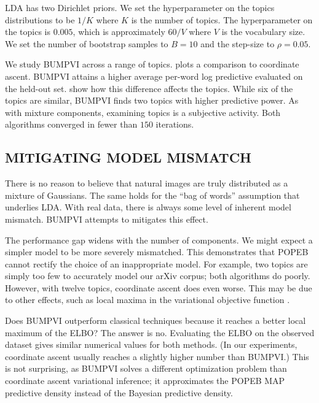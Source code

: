 \gls{LDA} has two Dirichlet priors. We set the hyperparameter on the topics
distributions to be $1/K$ where $K$ is the number of topics. The hyperparameter
on the topics is $0.005$, which is approximately $60/V$ where $V$ is
the vocabulary size. We set the number of bootstrap samples to
$B=10$ and the step-size to $\rho = 0.05$.

We study \gls{BUMPVI} across a range of topics.
 plots a comparison to coordinate ascent.
\gls{BUMPVI} attains a higher average per-word log predictive
evaluated on the held-out set.  show
how this difference affects the topics. While six of the topics are
similar, \gls{BUMPVI} finds two topics with higher predictive power.
As with mixture components, examining topics is a subjective activity.
Both algorithms converged in fewer than $150$ iterations.

\subsection{MITIGATING MODEL MISMATCH}

There is no reason to believe that natural images are
truly distributed as a mixture of Gaussians. The same holds for
the ``bag of words'' assumption that underlies \gls{LDA}. With real data,
there is always some level of inherent model mismatch. \gls{BUMPVI} attempts
to mitigates this effect.

The performance gap widens with the number of components.
We might expect a simpler model to be more severely
mismatched. This demonstrates that \gls{POPEB} cannot rectify
the choice of an inappropriate model. For example, two topics are simply too few
to accurately model our arXiv corpus; both algorithms do poorly.
However, with twelve topics, coordinate ascent does even worse.
This may be due to other effects, such as local maxima in the variational
objective function \citep{wainwright2008graphical}.

Does \gls{BUMPVI} outperform classical techniques because it reaches a better
local maximum of the \gls{ELBO}? The answer is no. Evaluating the \gls{ELBO} on
the observed dataset gives similar numerical values for both methods. (In
our experiments, coordinate ascent usually reaches a slightly higher number
than \gls{BUMPVI}.) This is not surprising, as
\gls{BUMPVI} solves a different optimization problem than coordinate ascent
variational inference; it approximates the \gls{POPEB} \gls{MAP}
predictive density instead of the Bayesian predictive density.


